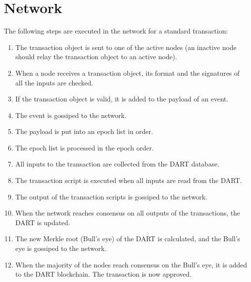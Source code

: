 \section{Network}
The following steps are executed in the network for a standard transaction:
\begin{enumerate}
 \item 
     The transaction object is sent to one of the active nodes (an inactive node should relay the transaction object to an active node).
 \item 
    When a node receives a transaction object, its format and the signatures of all the inputs are checked.
 \item 
    If the transaction object is valid, it is added to the payload of an event.
 \item 
    The event is gossiped to the network.
 \item 
    The payload is put into an epoch list in order.
 \item 
    The epoch list is processed in the epoch order.
 \item 
    All inputs to the transaction are collected from the DART database.
 \item 
    The transaction script is executed when all inputs are read from the DART.
 \item 
    The output of the transaction scripts is gossiped to the network.
 \item 
    When the network reaches consensus on all outputs of the transactions, the DART is updated. 
 \item 
    The new Merkle root (Bull’s eye) of the DART is calculated, and the Bull’s eye is gossiped to the network. 
 \item 
    When the majority of the nodes reach consensus on the Bull’s eye, it is added to the DART blockchain. The transaction is now approved.
\end{enumerate}
